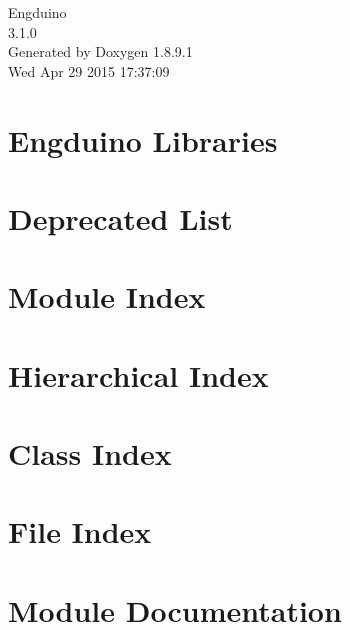 \documentclass[twoside]{book}
\newcommand{\+}{\discretionary{\mbox{\scriptsize$\hookleftarrow$}}{}{}}
\newcommand{\clearemptydoublepage}{%
  \newpage{\pagestyle{empty}\cleardoublepage}%
}
\begin{document}
\hypersetup{pageanchor=false,
             bookmarks=true,
             bookmarksnumbered=true,
             pdfencoding=unicode
            }
\begin{titlepage}
\vspace*{7cm}
\begin{center}%
{\Large Engduino \\[1ex]\large 3.\+1.\+0 }\\
\vspace*{1cm}
{\large Generated by Doxygen 1.8.9.1}\\
\vspace*{0.5cm}
{\small Wed Apr 29 2015 17:37:09}\\
\end{center}
\end{titlepage}
\clearemptydoublepage
\tableofcontents
\clearemptydoublepage
{}
\hypersetup{pageanchor=true}

\chapter{Engduino Libraries}
\label{index}\hypertarget{index}{}
\chapter{Deprecated List}
\label{deprecated}
\hypertarget{deprecated}{}

\chapter{Module Index}

\chapter{Hierarchical Index}

\chapter{Class Index}

\chapter{File Index}

\chapter{Module Documentation}









\end{document}

